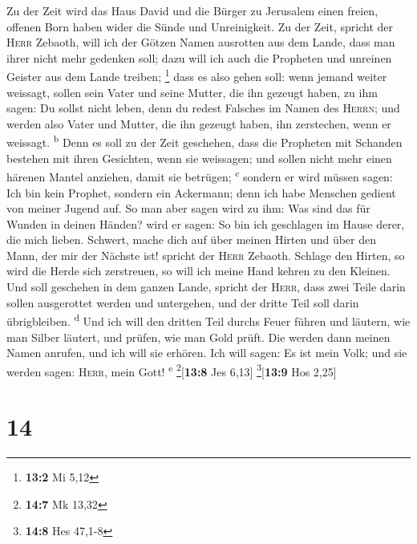  Zu der Zeit wird das Haus David und die Bürger zu
Jerusalem einen freien, offenen Born haben wider die Sünde und
Unreinigkeit.  Zu der Zeit, spricht der \textsc{Herr}
Zebaoth, will ich der Götzen Namen ausrotten aus dem Lande, dass man
ihrer nicht mehr gedenken soll; dazu will ich auch die Propheten und
unreinen Geister aus dem Lande treiben; \footnote{\textbf{13:2} Mi 5,12}
 dass es also gehen soll: wenn jemand weiter weissagt,
sollen sein Vater und seine Mutter, die ihn gezeugt haben, zu ihm sagen:
Du sollst nicht leben, denn du redest Falsches im Namen des
\textsc{Herrn}; und werden also Vater und Mutter, die ihn gezeugt haben,
ihn zerstechen, wenn er weissagt. \textsuperscript{b} 
Denn es soll zu der Zeit geschehen, dass die Propheten mit Schanden
bestehen mit ihren Gesichten, wenn sie weissagen; und sollen nicht mehr
einen härenen Mantel anziehen, damit sie betrügen; \textsuperscript{c}
 sondern er wird müssen sagen: Ich bin kein Prophet,
sondern ein Ackermann; denn ich habe Menschen gedient von meiner Jugend
auf.  So man aber sagen wird zu ihm: Was sind das für
Wunden in deinen Händen? wird er sagen: So bin ich geschlagen im Hause
derer, die mich lieben.  Schwert, mache dich auf über
meinen Hirten und über den Mann, der mir der Nächste ist! spricht der
\textsc{Herr} Zebaoth. Schlage den Hirten, so wird die Herde sich
zerstreuen, so will ich meine Hand kehren zu den Kleinen. 
Und soll geschehen in dem ganzen Lande, spricht der \textsc{Herr}, dass
zwei Teile darin sollen ausgerottet werden und untergehen, und der
dritte Teil soll darin übrigbleiben. \textsuperscript{d} 
Und ich will den dritten Teil durchs Feuer führen und läutern, wie man
Silber läutert, und prüfen, wie man Gold prüft. Die werden dann meinen
Namen anrufen, und ich will sie erhören. Ich will sagen: Es ist mein
Volk; und sie werden sagen: \textsc{Herr}, mein Gott!
\textsuperscript{e} \footnote{\textbf{14:7} Mk 13,32}{[}\textbf{13:8}
Jes 6,13{]} \footnote{\textbf{14:8} Hes 47,1-8}{[}\textbf{13:9} Hos
2,25{]}

\hypertarget{section-13}{%
\section{14}\label{section-13}}

